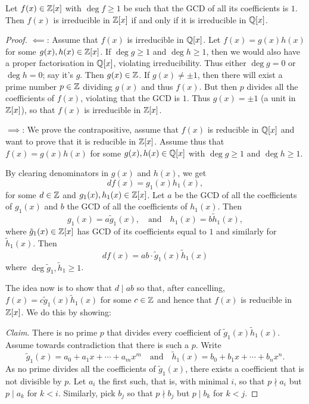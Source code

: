 \documentclass[10pt, a4paper]{article}
\begin{document}
\begin{theorem}
    Let $f(x) \in \mathbb{Z}[x]$ with $\deg{f} \geq 1$ be such that the GCD of all its coefficients is $1$.
    Then $f(x)$ is irreducible in $\mathbb{Z}[x]$ if and only if it is irreducible in $\mathbb{Q}[x]$.

    \begin{proof}
        $\impliedby$:
        Assume that $f(x)$ is irreducible in $\mathbb{Q}[x]$.
        Let $f(x) = g(x)h(x)$ for some $g(x), h(x) \in \mathbb{Z}[x]$.
        If $\deg{g} \geq 1$ and $\deg{h} \geq 1$,
        then we would also have a proper factorisation in $\mathbb{Q}[x]$,
        violating irreducibility.
        Thus either $\deg{g} = 0$ or $\deg{h} = 0$;
        say it's $g$.
        Then $g(x) \in \mathbb{Z}$.
        If $g(x) \neq \pm 1$,
        then there will exist a prime number $p \in \mathbb{Z}$ dividing $g(x)$ and thus $f(x)$.
        But then $p$ divides all the coefficients of $f(x)$,
        violating that the GCD is $1$.
        Thus $g(x) = \pm 1$
        (a unit in $\mathbb{Z}[x]$),
        so that $f(x)$ is irreducible in $\mathbb{Z}[x]$.

        $\implies$:
        We prove the contrapositive,
        assume that $f(x)$ is reducible in $\mathbb{Q}[x]$ and want to prove that it is reducible in $\mathbb{Z}[x]$.
        Assume thus that $f(x) = g(x)h(x)$ for some $g(x), h(x) \in \mathbb{Q}[x]$ with $\deg{g} \geq 1$ and $\deg{h} \geq 1$.

        By clearing denominators in $g(x)$ and $h(x)$,
        we get
        \[
        df(x) = g_1(x)h_1(x),
        \]
        for some $d \in \mathbb{Z}$ and $g_1(x), h_1(x) \in \mathbb{Z}[x]$.
        Let $a$ be the GCD of all the coefficients of $g_1(x)$ and $b$ the GCD of all the coefficients of $h_1(x)$.
        Then
        \[
        g_1(x) = a\tilde{g}_1(x),\quad\text{and}\quad h_1(x) = b\tilde{h}_1(x),
        \]
        where $\tilde{g}_1(x) \in \mathbb{Z}[x]$ has GCD of its coefficients equal to $1$ and similarly for $\tilde{h}_1(x)$.
        Then
        \begin{equation}\label{pre:algII:eq:eq1}\tag{*}
            df(x) = ab\cdot\tilde{g}_1(x)\tilde{h}_1(x)
        \end{equation}
        where $\deg{\tilde{g}_1}, \tilde{h}_1 \geq 1$.

        The idea now is to show that $d \mid ab$ so that,
        after cancelling,
        $f(x) = c\tilde{g}_1(x)\tilde{h}_1(x)$ for some $c \in \mathbb{Z}$ and hence that $f(x)$ is reducible in $\mathbb{Z}[x]$.
        We do this by showing:

        \textit{Claim}.
        There is no prime $p$ that divides every coefficient of $\tilde{g}_1(x)\tilde{h}_1(x)$.
        Assume towards contradiction that there is such a $p$.
        Write
        \[
        \tilde{g}_1(x) = a_0 + a_1x + \dotsi + a_mx ^ m\quad\text{and}\quad\tilde{h}_1(x) = b_0 + b_1x + \dotsi + b_nx ^ n.
        \]
        As no prime divides all the coefficients of $\tilde{g}_1(x)$,
        there exists a coefficient that is not divisible by $p$.
        Let $a_i$ the first such,
        that is,
        with minimal $i$,
        so that $p \nmid a_i$ but $p \mid a_k$ for $k < i$.
        Similarly,
        pick $b_j$ so that $p \nmid b_j$ but $p \mid b_k$ for $k < j$.


\end{proof}
\end{theorem}
\end{document}

